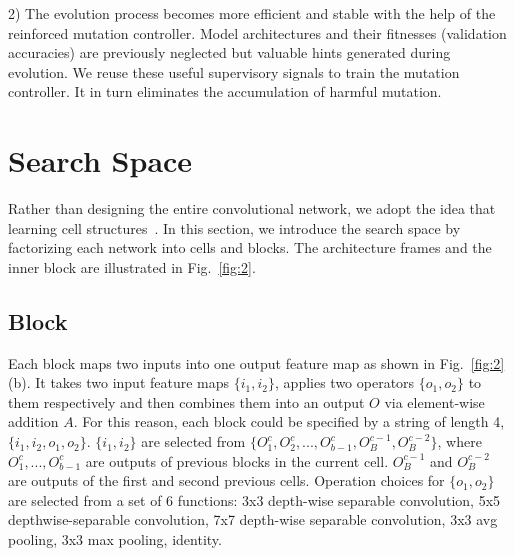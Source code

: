 \documentclass[10pt,twocolumn,letterpaper]{article}
\begin{document}
2) The evolution process becomes more efficient and stable with the help of the reinforced mutation controller. Model architectures and their fitnesses (validation accuracies) are previously neglected but valuable hints generated during evolution. We reuse these useful supervisory signals to train the mutation controller. It in turn eliminates the accumulation of harmful mutation.

\section{Search Space}
\label{3}
Rather than designing the entire convolutional network, we adopt the idea that learning cell structures~\cite{zoph2017learning}.
In this section, we introduce the search space by factorizing each network  into cells and blocks. 
The architecture frames and the inner block are illustrated in Fig.~\ref{fig:2}.

\subsection{Block} 
Each block maps two inputs into one output feature map as shown in Fig.~\ref{fig:2} (b). It takes two input feature maps $\{i_{1}, i_{2}\}$, applies two operators $\{o_{1}, o_{2}\}$ to them respectively and then combines them into an output $O$ via element-wise addition $A$.
For this reason, each block could be specified by a string of length 4, $\{i_1, i_2, o_1, o_2\}$. %
$\{i_1,i_2\}$ are selected from $\{O_1^c,O_2^c, ... ,O_{b-1}^c, O_B^{c-1}, O_B^{c-2}\}$, where $O_1^c, ... ,O_{b-1}^c$ are outputs of previous blocks in the current cell. $O_B^{c-1}$ and $O_B^{c-2}$ are outputs of the first and second previous cells. Operation choices for $\{o_1, o_2\}$ are selected from a set of 6 functions: 
3x3 depth-wise separable convolution, 
5x5 depthwise-separable convolution, 
7x7 depth-wise separable convolution, 
3x3 avg pooling, 3x3 max pooling, identity.
\end{document}
